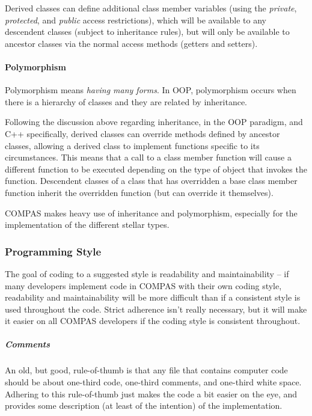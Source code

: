 Derived classes can define additional class member variables (using the \textit{private}, \textit{protected}, and \textit{public} access restrictions), which will be available to any descendent classes (subject to inheritance rules), but will only be available to ancestor classes via the normal access methods (getters and setters).

\paragraph{Polymorphism}\label{sec:Polymorphism}\mbox{}

\medskip
Polymorphism means \textit{having many forms}. In OOP, polymorphism occurs when there is a hierarchy of classes and they are related by inheritance.

Following the discussion above regarding inheritance, in the OOP paradigm, and C++ specifically, derived classes can override methods defined by ancestor classes, allowing a derived class to implement functions specific to its circumstances. This means that a call to a class member function will cause a different function to be executed depending on the type of object that invokes the function. Descendent classes of a class that has overridden a base class member function inherit the overridden function (but can override it themselves).

COMPAS makes heavy use of inheritance and polymorphism, especially for the implementation of the different stellar types.


\subsubsection{Programming Style}\label{sec:ProgrammingStyle}\mbox{}

\medskip
The goal of coding to a suggested style is readability and maintainability -- if many developers implement code in COMPAS with their own coding style, readability and maintainability will be more difficult than if a consistent style is used throughout the code. Strict adherence isn't really necessary, but it will make it easier on all COMPAS developers if the coding style is consistent throughout.

\subparagraph{Comments}\label{sec:Comments}\mbox{}

\medskip
An old, but good, rule-of-thumb is that any file that contains computer code should be about one-third code, one-third comments, and one-third white space. Adhering to this rule-of-thumb just makes the code a bit easier on the eye, and provides some description (at least of the intention) of the implementation.

